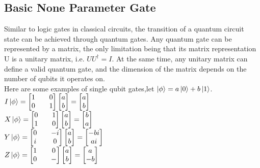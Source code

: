 \subsection{Basic None Parameter Gate}
Similar to logic gates in classical circuits, the transition of a quantum circuit state can be achieved through quantum gates. Any quantum gate can be represented by a matrix, the only limitation being that its matrix representation U is a unitary matrix, i.e. ${UU^{\dagger}=I}$.
At the same time, any unitary matrix can define a valid quantum gate, and the dimension of the matrix depends on the number of qubits it operates on.\\
Here are some examples of single qubit gates,let $\ket{\phi}=a\ket{0}+b\ket{1}$.\\
$I\ket{\phi}=\begin{bmatrix}
    1 && 0\\
    0 && 1
\end{bmatrix}\begin{bmatrix}
    a\\
    b
\end{bmatrix}=\begin{bmatrix}
    a\\
    b
\end{bmatrix}$ %
\\
$X\ket{\phi}=\begin{bmatrix}
    0 && 1\\
    1 && 0
\end{bmatrix}\begin{bmatrix}
    a\\
    b
\end{bmatrix}=\begin{bmatrix}
    b\\
    a
\end{bmatrix}$ %
\\
$Y\ket{\phi}=\begin{bmatrix}
    0 && -i\\
    i && 0
\end{bmatrix}\begin{bmatrix}
    a\\
    b
\end{bmatrix}=\begin{bmatrix}
    -bi\\
    ai
\end{bmatrix}$ %
\\
$Z\ket{\phi}=\begin{bmatrix}
    1 && 0\\
    0 && -
\end{bmatrix}\begin{bmatrix}
    a\\
    b
\end{bmatrix}=\begin{bmatrix}
    a\\
    -b
\end{bmatrix}$ %
